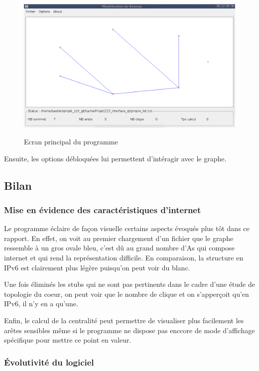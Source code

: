 \begin{figure}[H]
\centering
 \fbox
 {
 \includegraphics[width=16cm]{./schema/capture_ecran_graph.png}
 }
  \caption{\label{ecran_graph}Ecran principal du programme}
\end{figure}

\par
Ensuite, les options d\'ebloqu\'ees lui permettent d'int\'eragir avec le graphe.

\subsection{Bilan}

\subsubsection{Mise en évidence des caractéristiques d'internet}
\par
Le programme \'eclaire de fa\c con visuelle certains aspects \'evoqu\'es plus t\^ot dans ce rapport. En effet, on voit au premier chargement d'un fichier que le graphe ressemble \`a un gros ovale bleu, c'est d\^u au grand nombre d'As qui compose internet et qui rend la repr\'esentation difficile. En comparaison, la structure en IPv6 est clairement plus l\'eg\`ere puisqu'on peut voir du blanc.
\par
Une fois \'elimin\'es les stubs qui ne sont pas pertinents dans le cadre d'une \'etude de topologie du coeur, on peut voir que le nombre de clique et on s'apper\c coit qu'en IPv6, il n'y en a qu'une.
\par
Enfin, le calcul de la centralit\'e peut permettre de visualiser plus facilement les ar\^etes sensibles m\^eme si le programme ne dispose pas enccore de mode d'affichage sp\'ecifique pour mettre ce point en valeur.
\par

\subsubsection{\'Evolutivit\'e du logiciel}
